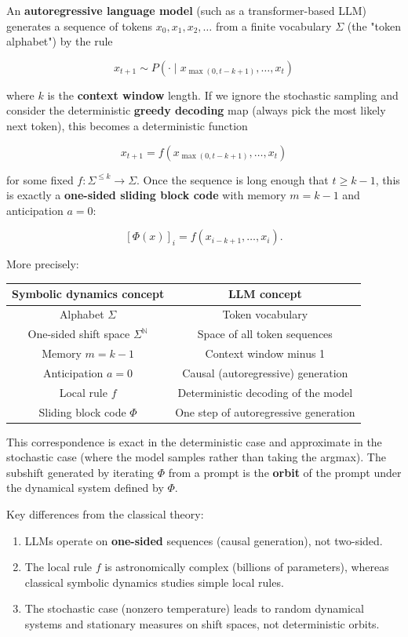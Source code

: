 An \textbf{autoregressive language model} (such as a transformer-based LLM) generates a sequence of tokens $x_0, x_1, x_2, \ldots$ from a finite vocabulary $\Sigma$ (the "token alphabet") by the rule

\[x_{t+1} \sim P(\cdot \mid x_{\max(0, t-k+1)}, \ldots, x_t)\]

where $k$ is the \textbf{context window} length. If we ignore the stochastic sampling and consider the deterministic \textbf{greedy decoding} map (always pick the most likely next token), this becomes a deterministic function

\[x_{t+1} = f(x_{\max(0, t-k+1)}, \ldots, x_t)\]

for some fixed $f: \Sigma^{\leq k} \to \Sigma$. Once the sequence is long enough that $t \geq k - 1$, this is exactly a \textbf{one-sided sliding block code} with memory $m = k - 1$ and anticipation $a = 0$:

\[[\Phi(x)]_i = f(x_{i-k+1}, \ldots, x_i).\]

More precisely:

\begin{center}
\begin{tabular}{cc}
\toprule
Symbolic dynamics concept & LLM concept \\
\midrule
Alphabet $\Sigma$ & Token vocabulary \\
One-sided shift space $\Sigma^\mathbb{N}$ & Space of all token sequences \\
Memory $m = k - 1$ & Context window minus 1 \\
Anticipation $a = 0$ & Causal (autoregressive) generation \\
Local rule $f$ & Deterministic decoding of the model \\
Sliding block code $\Phi$ & One step of autoregressive generation \\
\bottomrule
\end{tabular}
\end{center}

This correspondence is exact in the deterministic case and approximate in the stochastic case (where the model samples rather than taking the argmax). The subshift generated by iterating $\Phi$ from a prompt is the \textbf{orbit} of the prompt under the dynamical system defined by $\Phi$.

Key differences from the classical theory:
\begin{enumerate}
\item LLMs operate on \textbf{one-sided} sequences (causal generation), not two-sided.
\item The local rule $f$ is astronomically complex (billions of parameters), whereas classical symbolic dynamics studies simple local rules.
\item The stochastic case (nonzero temperature) leads to random dynamical systems and stationary measures on shift spaces, not deterministic orbits.
\end{enumerate}

